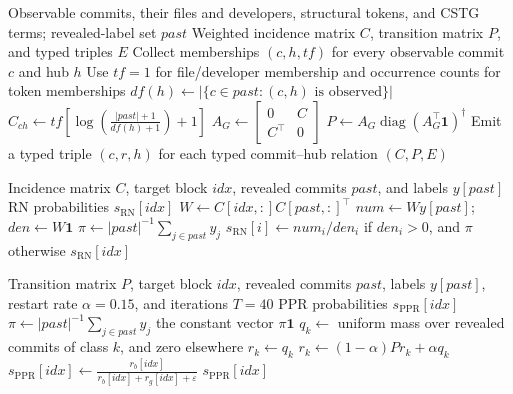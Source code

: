 \documentclass[final,5p,times,twocolumn]{elsarticle}
\theoremstyle{plain}
\begin{document}
\begin{algorithm}[!htbp]
\caption{Construction of the shared commit--hub representation}
\label{alg:hub}
\small
\begin{algorithmic}[1]
\Require Observable commits, their files and developers, structural tokens, and CSTG terms;
  revealed-label set $past$
\Ensure Weighted incidence matrix $C$, transition matrix $P$, and typed triples $E$
\State Collect memberships $(c,h,tf)$ for every observable commit $c$ and hub $h$
\State Use $tf=1$ for file/developer membership and occurrence counts for token memberships
  \State $df(h)\gets|\{c\in past:(c,h)\text{ is observed}\}|$
\EndFor
{}
  \State $C_{ch}\gets tf\left[\log\!\left(\frac{|past|+1}{df(h)+1}\right)+1\right]$
\EndFor
\State $A_G\gets\begin{bmatrix}0&C\\C^\top&0\end{bmatrix}$
\State $P\gets A_G\operatorname{diag}(A_G^\top\mathbf 1)^\dagger$
\State Emit a typed triple $(c,r,h)$ for each typed commit--hub relation
\State \Return $(C,P,E)$
\end{algorithmic}
\end{algorithm}


\begin{algorithm}[!htbp]
\caption{Relational Neighbour scoring}
\label{alg:rn}
\small
\begin{algorithmic}[1]
\Require Incidence matrix $C$, target block $idx$, revealed commits $past$, and labels $y[past]$
\Ensure RN probabilities $s_{\mathrm{RN}}[idx]$
\State $W\gets C[idx,:]C[past,:]^\top$
\State $num\gets Wy[past]$; $den\gets W\mathbf 1$
\State $\pi\gets |past|^{-1}\sum_{j\in past}y_j$
  \State $s_{\mathrm{RN}}[i]\gets num_i/den_i$ if $den_i>0$, and $\pi$ otherwise
\EndFor
\State \Return $s_{\mathrm{RN}}[idx]$
\end{algorithmic}
\end{algorithm}


\begin{algorithm}[!htbp]
\caption{Class-seeded Personalised PageRank scoring}
\label{alg:ppr}
\small
\begin{algorithmic}[1]
\Require Transition matrix $P$, target block $idx$, revealed commits $past$,
  labels $y[past]$, restart rate $\alpha=0.15$, and iterations $T=40$
\Ensure PPR probabilities $s_{\mathrm{PPR}}[idx]$
\State $\pi\gets |past|^{-1}\sum_{j\in past}y_j$
  \State \Return the constant vector $\pi\mathbf 1$
\EndIf
{}
  \State $q_k\gets$ uniform mass over revealed commits of class $k$, and zero elsewhere
  \State $r_k\gets q_k$
    \State $r_k\gets(1-\alpha)Pr_k+\alpha q_k$
  \EndFor
\EndFor
\State $s_{\mathrm{PPR}}[idx]\gets
  \frac{r_b[idx]}{r_b[idx]+r_g[idx]+\varepsilon}$
\State \Return $s_{\mathrm{PPR}}[idx]$
\end{algorithmic}
\end{algorithm}
\end{document}
